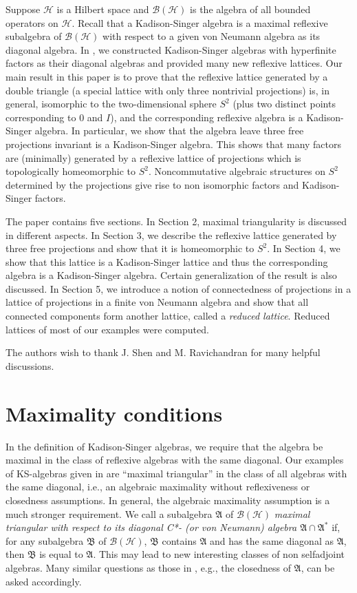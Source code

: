 \documentclass{pnastwo}
\newcommand{\AAA}{\mathfrak A}
\newcommand{\B}{\mathcal B}
\newcommand{\BBB}{\mathfrak B}
\newcommand{\HHH}{\mathcal H} %
\begin{document}
\begin{article}
Suppose $\HHH$ is a Hilbert space and $\B(\HHH)$ is the algebra of all
bounded operators on $\HHH$. Recall that a Kadison-Singer algebra is
a maximal reflexive subalgebra of $\B(\HHH)$ with respect to a given
von Neumann algebra as its diagonal algebra. In \cite{GY}, we
constructed Kadison-Singer algebras with hyperfinite factors as
their diagonal algebras and provided many new reflexive lattices.
Our main result in this paper is to prove that the reflexive
lattice generated by a double triangle (a special lattice with
only three nontrivial projections) is, in general, isomorphic to
the two-dimensional sphere $S^2$ (plus two distinct points
corresponding to $0$ and $I$), and the corresponding reflexive
algebra is a Kadison-Singer algebra. In particular, we show that
the algebra leave three free projections invariant is a
Kadison-Singer algebra. This shows that many factors are
(minimally) generated by a reflexive lattice of projections which
is topologically homeomorphic to  $S^2$. Noncommutative algebraic
structures on $S^2$ determined by the projections give rise to non
isomorphic factors and Kadison-Singer factors.

The paper contains five sections. In Section 2, maximal
triangularity is discussed in different aspects. In Section 3, we
describe the reflexive lattice generated by three free projections
and show that it is homeomorphic to $S^2$. In Section 4, we show
that this lattice is a Kadison-Singer lattice and thus the
corresponding algebra is a Kadison-Singer algebra. Certain
generalization of the result is also discussed. In Section 5, we
introduce a notion of connectedness of projections in a lattice of
projections in a finite von Neumann algebra and show that all
connected components form another lattice, called a {\it reduced
lattice}. Reduced lattices of most of our examples were computed.

The authors wish to thank J. Shen and M. Ravichandran for many
helpful discussions.

\section{Maximality conditions}

In the definition of Kadison-Singer algebras, we require
that the algebra be maximal in the class of reflexive algebras
with the same diagonal. Our examples of KS-algebras given in \cite{GY}
are ``maximal triangular'' in the class of all algebras with the
same diagonal, i.e., an algebraic maximality without reflexiveness
or closedness assumptions. In general, the algebraic maximality
assumption is a much stronger requirement. We call a subalgebra
$\AAA$ of $\B(\HHH)$ {\it maximal triangular with respect to its
diagonal C*- (or von Neumann) algebra $\AAA\cap\AAA^*$} if, for any
subalgebra $\BBB$ of $\B(\HHH)$, $\BBB$ contains $\AAA$ and has
the same diagonal as $\AAA$, then $\BBB$ is equal to $\AAA$. This
may lead to new interesting classes of non selfadjoint algebras.
Many similar questions as those in \cite{KS}, e.g., the closedness of
$\AAA$, can be asked accordingly.


\end{article}
\end{document}
